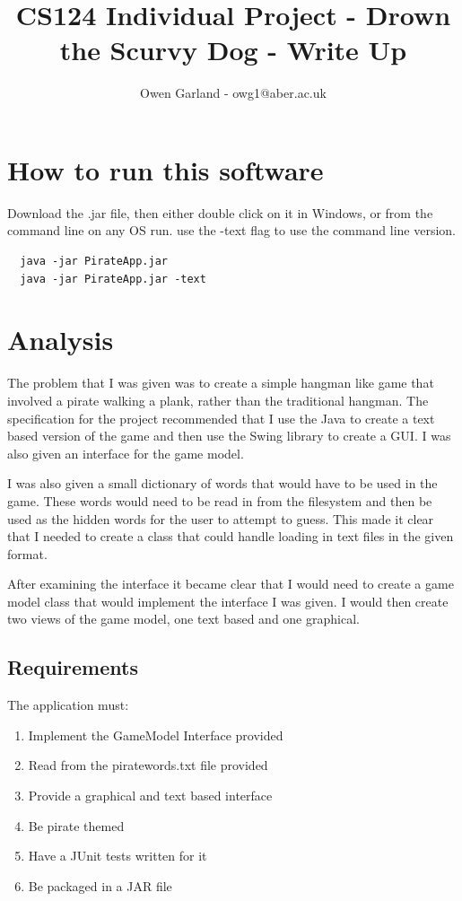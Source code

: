 \documentclass[notitlepage]{report}
\makeatletter
\newcommand*{\toccontents}{\@starttoc{toc}}
\makeatother
\begin{document}
\title{CS124 Individual Project  - Drown the Scurvy Dog - Write Up}
\author{Owen Garland - owg1@aber.ac.uk}
\date{}
\maketitle
\toccontents

\section{How to run this software}
Download the .jar file, then either double click on it in Windows, or from the command line on any OS run. use the -text flag to use the command line version. 

\begin{lstlisting}
  java -jar PirateApp.jar 
  java -jar PirateApp.jar -text
\end{lstlisting}

\section{Analysis}
The problem that I was given was to create a simple hangman like game that involved a pirate walking a plank, rather than the traditional hangman. The specification for the project recommended that I use the Java  to create a text based version of the game and then use the  Swing library to create a GUI. I was also given an interface for the game model. 

I was also given a small dictionary of words that would have to be used in the game. These words would need to be read in from the filesystem and then be used as the hidden words for the user to attempt to guess. This made it clear that I needed to create a class that could handle loading in text files in the given format. 

After examining the interface it became clear that I would need to create a game model class that would implement the interface I was given. I would then create two views of the game model, one text based and one graphical. 


\subsection{Requirements}
The application must: 
\begin{enumerate}
  \item Implement the GameModel Interface provided
  \item Read from the piratewords.txt file provided
  \item Provide a graphical and text based interface
  \item Be pirate themed
  \item Have a JUnit tests written for it
  \item Be packaged in a JAR file
\end{enumerate}
\end{document}
